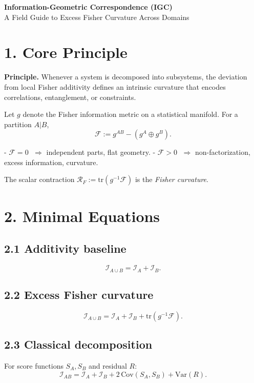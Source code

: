 \documentclass[12pt]{article}
\begin{document}
\begin{center}
{\LARGE \textbf{Information-Geometric Correspondence (IGC)}}\\[0.5em]
{\large A Field Guide to Excess Fisher Curvature Across Domains}
\end{center}

\vspace{1em}

\section*{1. Core Principle}
\begin{mybox}
\textbf{Principle.} Whenever a system is decomposed into subsystems, the deviation from local Fisher additivity defines an intrinsic curvature that encodes correlations, entanglement, or constraints.
\end{mybox}

Let $g$ denote the Fisher information metric on a statistical manifold. For a partition $A|B$,
\[
\mathcal{F} := g^{AB} - (g^A \oplus g^B).
\]

- $\mathcal F = 0$ $\;\Rightarrow$ independent parts, flat geometry.
- $\mathcal F > 0$ $\;\Rightarrow$ non-factorization, excess information, curvature.

\noindent The scalar contraction $\mathcal R_F := \mathrm{tr}(g^{-1}\mathcal F)$ is the \emph{Fisher curvature}.

\section*{2. Minimal Equations}
\subsection*{2.1 Additivity baseline}
\[
\mathcal I_{A\cup B} = \mathcal I_A + \mathcal I_B.
\]

\subsection*{2.2 Excess Fisher curvature}
\[
\mathcal I_{A\cup B} = \mathcal I_A + \mathcal I_B + \mathrm{tr}(g^{-1}\mathcal F).
\]

\subsection*{2.3 Classical decomposition}
For score functions $S_A,S_B$ and residual $R$:
\[
\mathcal I_{AB} = \mathcal I_A + \mathcal I_B + 2\,\mathrm{Cov}(S_A,S_B) + \mathrm{Var}(R).
\]
\end{document}
